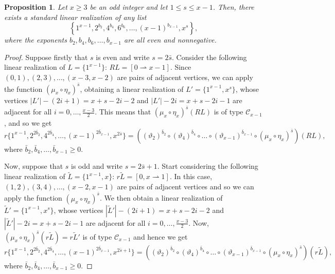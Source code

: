 \documentclass{amsart}
\newtheorem{prop}{Proposition}[section]
\theoremstyle{definition}
\numberwithin{equation}{section}
\def\C{\mathcal{C}}
\def\su{ \rightharpoonup}
\def\giu{\rightharpoonup}
\def\th{\vartheta}
\begin{document}
\begin{prop}\label{prop:even+1odd}
Let $x\geq 3$ be an odd integer and let  $1\leq s\leq x-1$.
Then, there exists a standard linear realization of any list
$$\left\{1^{x-1}, 2^{b_2}, 4^{b_4}, 6^{b_6}, \ldots,(x-1)^{b_{x-1}}, x^{s} \right\},$$
where the exponents $b_2,b_4,b_6,\ldots,b_{x-1}$ are all even and nonnegative.
\end{prop}

\begin{proof}
Suppose firstly that $s$ is even and write $s=2\bar s$.
Consider the following linear realization of
$L=\{1^{x-1}\}$: $RL=[0 \su x-1]$.
Since $(0,1), (2,3),\ldots, (x-3,x-2)$ are pairs of adjacent vertices, we
can apply the function
$(\mu_x\circ \eta_x)^{\bar s}$,  obtaining a linear realization of $L'=\{1^{x-1},x^s\}$, whose
vertices $|L'|-(2i+1)=x+s-2i-2$ and $|L'|-2i=x+s-2i-1$ are adjacent for all $i=0,\ldots,\frac{x-3}{2}$.
This means that $(\mu_x\circ \eta_x)^{\bar s}(RL)$ is of type $\C_{x-1}$, and so we get
$$r\{1^{x-1}, 2^{2\bar b_2}, 4^{2 \bar b_4}, \ldots,(x-1)^{2\bar b_{x-1}}, x^{2\bar s} \}=
((\th_{2})^{\bar b_2} \circ (\th_{4})^{\bar b_4} \circ \ldots\circ (\th_{x-1})^{\bar b_{x-1}}\circ
(\mu_x\circ \eta_x)^{\bar s})(RL),$$
where $\bar b_2, \bar b_4, \ldots,\bar b_{x-1}\geq 0$.

Now, suppose that $s$ is odd and write $s=2 \bar s+1$. Start considering the following linear realization of
$\tilde L=\{1^{x-1},x\}$: $r\tilde L=[0,x \giu 1]$.
In this case,  $(1,2), (3,4),\ldots, (x-2,x-1)$ are pairs of adjacent vertices and so we
can apply the function $(\mu_x\circ \eta_x)^{\bar s}$. We then obtain a linear realization of
$\tilde L'=\{1^{x-1},x^s\}$, whose vertices $|\tilde L'|-(2i+1)=x+s-2i-2$ and $|\tilde L'|-2i=x+s-2i-1$ are adjacent
for all $i=0,\ldots,\frac{x-3}{2}$. Now, $(\mu_x\circ \eta_x)^{\bar s}(r\tilde L)=r \tilde L'$ is of type $\C_{x-1}$ and hence we
get
$$r\{1^{x-1}, 2^{2\bar b_2}, 4^{2 \bar b_4}, \ldots,(x-1)^{2\bar b_{x-1}}, x^{2\bar s+1} \}=
((\th_{2})^{\bar b_2} \circ (\th_{4})^{\bar b_4} \circ \ldots\circ (\th_{x-1})^{\bar b_{x-1}}\circ
(\mu_x\circ \eta_x)^{\bar s})(r\tilde L),$$
where $\bar b_2, \bar b_4, \ldots,\bar b_{x-1}\geq 0$.
\end{proof}
\end{document}
